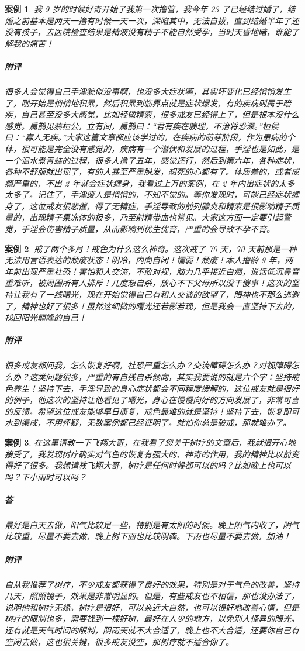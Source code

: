 \documentclass{ctexart}
\newtheorem{case}{案例}
\begin{document}
\begin{case}
    我 9 岁的时候好奇开始了我第一次撸管，我今年 23 了已经结过婚了，结婚之前基本是两天一撸有时候一天一次，深陷其中，无法自拔，直到结婚半年了还没有孩子，去医院检查结果是精液没有精子不能自然受孕，当时天昏地暗，谁能了解我的痛苦！
    \subparagraph{附评} 很多人会觉得自己手淫貌似没事啊，也没多大症状啊，其实坏变化已经悄悄发生了，刚开始是悄悄地积累，然后积累到临界点就是症状爆发，有的疾病则属于暗疾，自己甚至没多大感觉，比如轻微精索，很多戒友已经得上了，但是根本没什么感觉。扁鹊见蔡桓公，立有间，扁鹊曰：“君有疾在腠理，不治将恐深。”桓侯曰：“寡人无疾。”大家这篇文章都应该学过的，在疾病的萌芽阶段，作为患病的个体，很可能是完全没有感觉的，疾病有一个潜伏和发展的过程，手淫也是如此，是一个温水煮青蛙的过程，很多人撸了五年，感觉还行，然后到第六年，各种症状，各种不舒服就出现了，有的人甚至严重脱发，想死的心都有了。体质差的，或者成瘾严重的，不出 2 年就会症状缠身，我看过上万的案例，在 2 年内出症状的太多太多了。记住了，手淫废人是悄悄的，不知不觉的。等你发现时，可能已经症状缠身了，这位戒友很悲催，得了无精症，手淫导致的前列腺炎和精索是很影响精子质量的，出现精子果冻体的极多，乃至射精带血也常见。大家这方面一定要引起警觉，手淫会伤害精子质量，从而影响到优生优育，严重的会导致不孕不育。
\end{case}

\begin{case}
    戒了两个多月！戒色为什么这么神奇。这次戒了 70 天，70 天前那是一种无法用言语表达的颓废状态！阴冷，内向自闭！懦弱！颓废！本人撸龄 9 年，两年前出现严重社恐！害怕和人交流，不敢对视，脑力几乎接近白痴，说话低沉鼻音重难听，被周围所有人排斥！几度想自杀，放心不下父母所以没干傻事！这次的坚持让我有了一线曙光，现在开始觉得自己有和人交谈的欲望了，眼神也不那么逃避了，精神也好了很多！虽然这细微的曙光还若影若现，但是我会一直坚持下去的，找回阳光巅峰的自己！
    \subparagraph{附评} 很多戒友都问我，怎么恢复好啊，社恐严重怎么办？交流障碍怎么办？对视障碍怎么办？这类问题很多，严重的有自残自杀倾向，其实我要说的就是六个字：坚持戒色养生！坚持下去，手淫导致的身心症状都会不同程度缓解的，这位戒友就是很好的例子，他这次的坚持让他看见了曙光，身心在慢慢向好的方向发展了，非常可喜的反馈。希望这位戒友能够早日康复，戒色最难的就是坚持！坚持下去，恢复即可水到渠成，不用怀疑，无数案例都已经证明了。就怕你总是破戒，那就难办了。
\end{case}

\begin{case}
    在这里请教一下飞翔大哥，在我看了您关于树疗的文章后，我就很开心地接受了，我发现树疗确实对气色的恢复有强大的、神奇的作用，我的精神比以前变得好了很多。我想请教飞翔大哥，树疗是任何时候都可以的吗？比如晚上也可以吗？下小雨时可以吗？
    \subparagraph{答} 最好是白天去做，阳气比较足一些，特别是有太阳的时候。晚上阳气内收了，阴气比较重，尽量不要去做，晚上树下面也比较阴森。下雨也尽量不要去做，加油！
    \subparagraph{附评} 自从我推荐了树疗，不少戒友都获得了良好的效果，特别是对于气色的改善，坚持几天，照照镜子，效果是非常明显的。但是，有些戒友也不相信，那也没办法了，说明他和树疗无缘。树疗是很好，可以亲近大自然，也可以很好地改善心情，但是树疗的限制也多，需要找到一棵好树，最好在人少的地方，以免别人怪异的眼光。还有就是天气时间的限制，阴雨天就不大合适了，晚上也不大合适，还要你自己有空闲去做，这也很关键，很多戒友没空，那树疗就不适合你了。
\end{case}
\end{document}

